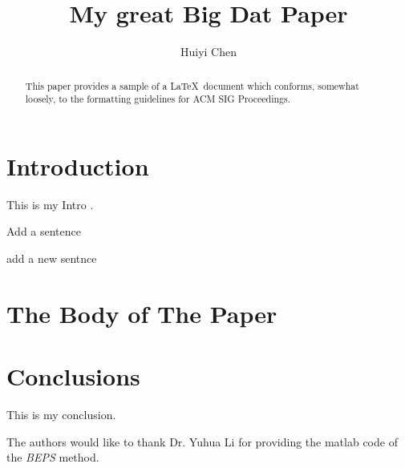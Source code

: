 \documentclass[sigconf]{acmart}
\begin{document}
\title{My great Big Dat Paper}


\author{Huiyi Chen}



\renewcommand{\shortauthors}{B. Trovato et al.}


\begin{abstract}
This paper provides a sample of a \LaTeX\ document which conforms,
somewhat loosely, to the formatting guidelines for
ACM SIG Proceedings.
\end{abstract}



\maketitle

\section{Introduction}

This is my Intro \cite{Editor00}.

Add a sentence

add a new sentnce


\section{The Body of The Paper}


\section{Conclusions}

This is my conclusion.



\begin{acks}

  The authors would like to thank Dr. Yuhua Li for providing the
  matlab code of the \textit{BEPS} method.

 
\end{acks}


 
\end{document}
